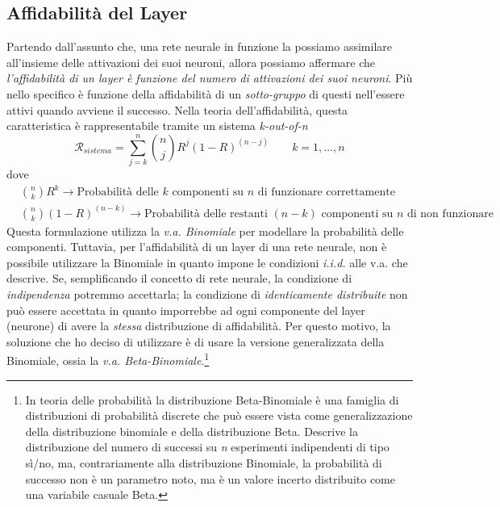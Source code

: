 \documentclass[10pt]{article} %
\begin{document}
\subsection{Affidabilità del Layer}
Partendo dall'assunto che, una rete neurale in funzione la possiamo assimilare all'insieme delle attivazioni dei suoi neuroni, allora possiamo affermare che \textit{l'affidabilità di un layer è funzione del numero di attivazioni dei suoi neuroni}. Più nello specifico è funzione della affidabilità di un \textit{sotto-gruppo} di questi nell'essere attivi quando avviene il successo.
Nella teoria dell'affidabilità, questa caratteristica è rappresentabile tramite un sistema \textit{k-out-of-n}
\begin{equation}
    \mathcal{R}_{sistema} = \sum_{j=k}^{n}\binom{n}{j} R^{j}(1-R)^{(n-j)} \qquad k=1,\dots, n
\end{equation}
dove 
\begin{align}
    &\binom{n}{k} R^{k} \longrightarrow \text{Probabilità delle $k$ componenti su $n$ di funzionare correttamente} \\
    &\binom{n}{k} (1-R)^{(n-k)} \longrightarrow \text{Probabilità delle restanti $(n-k)$ componenti su $n$ di non funzionare}
\end{align}
Questa formulazione utilizza la \textit{v.a. Binomiale} per modellare la probabilità delle componenti. Tuttavia, per l'affidabilità di un layer di una rete neurale, non è possibile utilizzare la Binomiale in quanto impone le condizioni \textit{i.i.d.} alle v.a. che descrive. Se, semplificando il concetto di rete neurale, la condizione di \textit{indipendenza} potremmo accettarla; la condizione di \textit{identicamente distribuite} non può essere accettata in quanto imporrebbe ad ogni componente del layer (neurone) di avere la \textit{stessa} distribuzione di affidabilità.
Per questo motivo, la soluzione che ho deciso di utilizzare è di usare la versione generalizzata della Binomiale, ossia la \textit{v.a. Beta-Binomiale}.\footnote{In teoria delle probabilità la distribuzione Beta-Binomiale è una famiglia di distribuzioni di probabilità discrete che può essere vista come generalizzazione della distribuzione binomiale e della distribuzione Beta. Descrive la distribuzione del numero di successi su \textit{n} esperimenti indipendenti di tipo sì/no, ma, contrariamente alla distribuzione Binomiale, la probabilità di successo non è un parametro noto, ma è un valore incerto distribuito come una variabile casuale Beta.}
\end{document}
